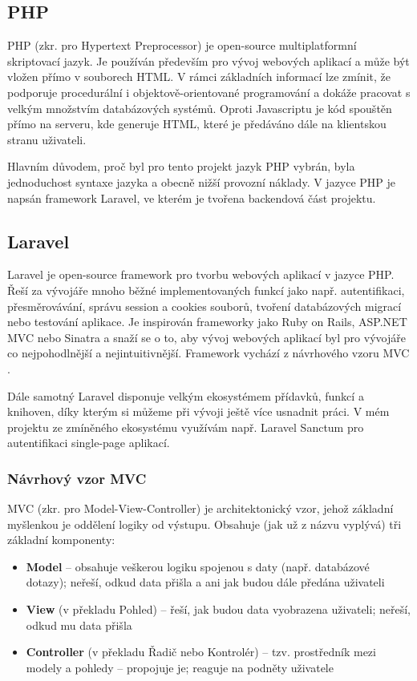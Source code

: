 	\subsection{PHP}
	PHP (zkr. pro Hypertext Preprocessor) je open-source multiplatformní skriptovací jazyk. Je používán především pro vývoj webových aplikací a může být vložen přímo v souborech HTML. V rámci základních informací lze zmínit, že podporuje procedurální i objektově-orientované programování a dokáže pracovat s velkým množstvím databázových systémů. Oproti Javascriptu je kód spouštěn přímo na serveru, kde generuje HTML, které je předáváno dále na klientskou stranu uživateli. \cite{PHP1} \cite{PHP2}
	
	Hlavním důvodem, proč byl pro tento projekt jazyk PHP vybrán, byla jednoduchost syntaxe jazyka a obecně nižší provozní náklady. V jazyce PHP je napsán framework Laravel, ve kterém je tvořena backendová část projektu.
	
	\subsection{Laravel}
	Laravel je open-source framework pro tvorbu webových aplikací v jazyce PHP. Řeší za vývojáře mnoho běžné implementovaných funkcí jako např. autentifikaci, přesměrovávání, správu session a cookies souborů, tvoření databázových migrací nebo testování aplikace. Je inspirován frameworky jako Ruby on Rails, ASP.NET MVC nebo Sinatra a snaží se o to, aby vývoj webových aplikací byl pro vývojáře co nejpohodlnější a nejintuitivnější. \cite{Laravel1} Framework vychází z návrhového vzoru MVC \cite{LaravelMVC}.
	
	Dále samotný Laravel disponuje velkým ekosystémem přídavků, funkcí a knihoven, díky kterým si můžeme při vývoji ještě více usnadnit práci. \cite{LaravelEco} V mém projektu ze zmíněného ekosystému využívám např. Laravel Sanctum pro autentifikaci single-page aplikací.
	
		\subsubsection{Návrhový vzor MVC}
		MVC (zkr. pro Model-View-Controller) je architektonický vzor, jehož základní myšlenkou je oddělení logiky od výstupu. Obsahuje (jak už z názvu vyplývá) tři základní komponenty:
		
		\begin{itemize}
			\item \textbf{Model} – obsahuje veškerou logiku spojenou s daty (např. databázové dotazy); neřeší, odkud data přišla a ani jak budou dále předána uživateli
			\item \textbf{View} (v překladu Pohled) – řeší, jak budou data vyobrazena uživateli; neřeší, odkud mu data přišla
			\item \textbf{Controller} (v překladu Řadič nebo Kontrolér) – tzv. prostředník mezi modely a pohledy – propojuje je; reaguje na podněty uživatele
		\end{itemize}
	
